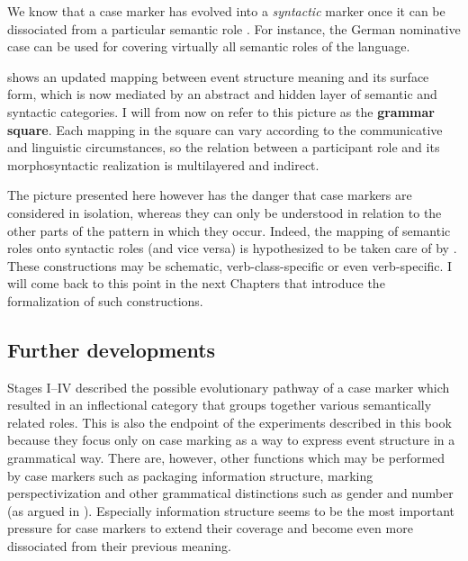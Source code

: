 We know that a case marker has evolved into a {\em syntactic} marker once it can be dissociated from a particular semantic role \citep[2--3]{givon97introduction}. For instance, the German nominative case can be used for covering virtually all semantic roles of the language. 

 shows an updated mapping between event structure meaning and its surface form, which is now mediated by an abstract and hidden layer of semantic and syntactic categories. I will from now on refer to this picture as the {\bfseries grammar square}. Each mapping in the square can vary according to the communicative and linguistic circumstances, so the relation between a participant role and its morphosyntactic realization is multilayered and indirect.

The picture presented here however has the danger that case markers are considered in isolation, whereas they can only be understood in relation to the other parts of the pattern in which they occur. Indeed, the mapping of semantic roles onto syntactic roles (and vice versa) is hypothesized to be taken care of by  \citep{goldberg95construction}. These constructions may be schematic, verb-class-specific or even verb-specific. I will come back to this point in the next Chapters that introduce the formalization of such constructions.

\subsection{Further developments}
\label{s:case-markers}

\largerpage
Stages I--IV described the possible evolutionary pathway of a case marker which resulted in an inflectional category that groups together various semantically related roles. This is also the endpoint of the experiments described in this book because they focus only on case marking as a way to express event structure in a grammatical way. There are, however, other functions which may be performed by case markers such as packaging information structure, marking perspectivization and other grammatical distinctions such as gender and number (as argued in ). Especially information structure seems to be the most important pressure for case markers to extend their coverage and become even more dissociated from their previous meaning.

